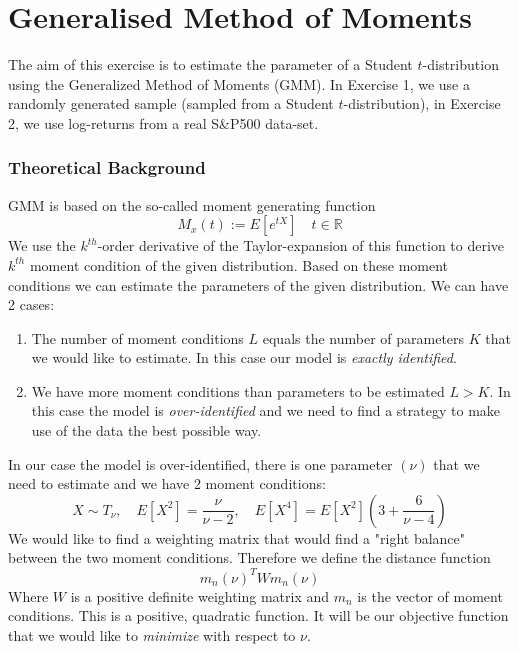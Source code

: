 \chapter{Generalised Method of Moments}

The aim of this exercise is to estimate the parameter of a Student $t$-distribution using the Generalized Method of Moments (GMM). In Exercise 1, we use a randomly generated sample (sampled from a Student $t$-distribution), in Exercise 2, we use log-returns from a real S\&P500 data-set. 

\subsection*{Theoretical Background}

GMM is based on the so-called moment generating function 
\begin{equation*}
M_x(t):= E[e^{tX}]\quad t\in \mathbb{R}
\end{equation*}
We use the $k^{th}$-order derivative of the Taylor-expansion of this function to derive  $k^{th}$ moment condition of the given distribution. Based on these moment conditions we can estimate the parameters of the given distribution. We can have 2 cases: 
\begin{enumerate}
\item The number of moment conditions $L$ equals the number of parameters $K$ that we would like to estimate. In this case our model is \textit{exactly identified}.
\item We have more moment conditions than parameters to be estimated $L>K$. In this case the model is \textit{over-identified} and we need to find a strategy to make use of the data the best possible way.
\end{enumerate}
In our case the model is over-identified, there is one parameter $(\nu)$ that we need to estimate and we have 2 moment conditions:
\begin{equation*}
X \sim T_{\nu}, \quad E[X^2]=\frac{\nu}{\nu-2}, \quad E[X^4]=E[X^2]\left(3+\frac{6}{\nu-4}\right)
\end{equation*}
We would like to find a weighting matrix that would find a "right balance" between the two moment conditions. Therefore we define the distance function
\begin{equation*}
m_n(\nu)^T W m_n(\nu)
\end{equation*}
Where $W$ is a positive definite weighting matrix and $m_n$ is the vector of moment conditions. This is a positive, quadratic function. It will be our objective function that we would like to \textit{minimize} with respect to $\nu$.
